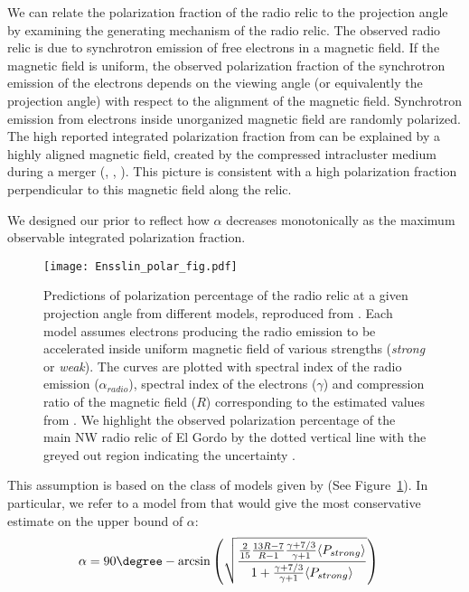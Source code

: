 We can relate the polarization fraction of the radio relic to the
projection angle by examining the
generating mechanism of the radio relic.
The observed radio relic is due to synchrotron emission of free electrons in a
magnetic field. If the magnetic field is uniform, the observed
polarization fraction of the synchrotron emission of the electrons depends on the
viewing angle (or equivalently the projection angle) with respect to the alignment of the magnetic field. 
Synchrotron emission from electrons inside unorganized magnetic field are
randomly polarized. The high reported integrated polarization fraction from
\citet{L13} can be explained by a highly aligned magnetic field,
created by the compressed intracluster medium during a merger
(\citealt{E98}, \citealt{vanWeeren10}, \citealt{Feretti12}).
This picture is consistent with a high polarization fraction perpendicular
to this magnetic field along the relic. 
\par
We designed our prior to reflect how $\alpha$ decreases monotonically as the
maximum observable integrated polarization fraction. 
\begin{figure}
	\texttt{[image: Ensslin\_polar\_fig.pdf]}
	\caption{Predictions of polarization percentage of the radio relic at a
		given projection angle from different models, reproduced from
		\citealt{E98}. Each model assumes electrons producing the radio emission
		to be accelerated inside uniform magnetic field of various strengths ({\it strong} or {\it weak}). The curves are plotted with spectral index of the radio emission
		($\alpha_{radio}$), spectral index of the electrons ($\gamma$) and
		compression ratio of the magnetic field ($R$) corresponding to the
		estimated values from \citet{L13}.
		We highlight the observed polarization percentage of the main NW radio relic
		of El Gordo by the dotted vertical line with the greyed out region
		indicating the uncertainty \citep{L13}.\label{fig:Ensslin_fig}}
\end{figure}
This assumption is based on the class of models given by \cite{E98}(See
Figure~\ref{fig:Ensslin_fig}). In particular, we refer to a model from \cite{E98} that would give the most
conservative estimate on the upper bound of $\alpha$:
\begin{align}
\alpha &= 90 \degree -
\arcsin
\left(
\sqrt{
\frac{
	\frac{2}{15} \frac{13R - 7}{R - 1} \frac{\gamma + 7/3}{\gamma + 1}
	\langle P_{strong} \rangle}{
	1 + \frac{\gamma + 7/3}{ \gamma +1} \langle P_{strong} \rangle }}\right)
\end{align}

